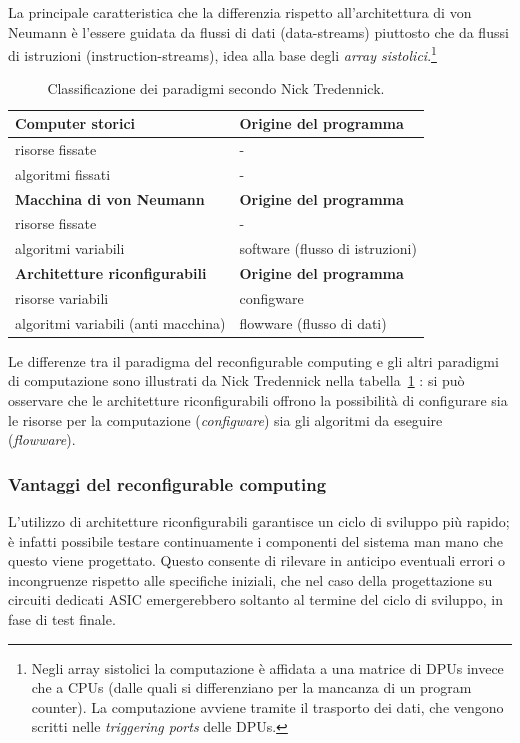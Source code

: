 La principale caratteristica che la differenzia rispetto all'architettura di von Neumann è
l'essere guidata da flussi di dati (data-streams) piuttosto che da flussi di istruzioni
(instruction-streams), idea alla base degli \emph{array sistolici}.\footnote{Negli array
sistolici la computazione è affidata a una matrice di \acp{DPU} invece che a \acsp{CPU}
(dalle quali si differenziano per la mancanza di un program counter). La computazione
avviene tramite il trasporto dei dati, che vengono scritti nelle \emph{triggering ports}
delle \acp{DPU}.}



\begin{table}[ht]
\begin{center}
 \begin{tabular}{l | l}
 \hline
 \textbf{Computer storici} & \textbf{Origine del programma}\\
 \hline
 risorse fissate & -\\
 algoritmi fissati & -\\
 \hline
 \textbf{Macchina di von Neumann} & \textbf{Origine del programma}\\
 \hline
 risorse fissate & -\\
 algoritmi variabili & software (flusso di istruzioni)\\
 \hline
 \textbf{Architetture riconfigurabili} & \textbf{Origine del programma}\\
 \hline
 risorse variabili & configware\\
 algoritmi variabili (anti macchina) & flowware (flusso di dati)
 \end{tabular}
 \caption{Classificazione dei paradigmi secondo Nick Tredennick.}
 \label{tab:TredennickClassificationScheme}
 \end{center}
\end{table}

Le differenze tra il paradigma del reconfigurable computing e gli altri paradigmi di
computazione sono illustrati da Nick Tredennick nella
tabella~\ref{tab:TredennickClassificationScheme} \cite{TredennickClassification}: si può
osservare che le architetture riconfigurabili offrono la possibilità di configurare sia le
risorse per la computazione (\emph{configware}) sia gli algoritmi da eseguire
(\emph{flowware}). 

\subsubsection{Vantaggi del reconfigurable computing}
L'utilizzo di architetture riconfigurabili garantisce un ciclo di sviluppo pi\`u rapido;
\`e infatti possibile testare continuamente i componenti del sistema man mano che questo viene
progettato. Questo consente di rilevare in anticipo eventuali errori o incongruenze rispetto alle
specifiche iniziali, che nel caso della progettazione su circuiti dedicati \ac{ASIC} emergerebbero
soltanto al termine del ciclo di sviluppo, in fase di test finale.


